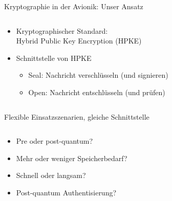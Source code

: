 \begin{frame}[c]{Kryptographie in der Avionik: Unser Ansatz}
  \begin{columns}[fullwidth,c]
    \begin{column}{.65\linewidth}
      \begin{itemize}
        \item Kryptographischer Standard:\\
        Hybrid Public Key Encryption (HPKE)
        \item Schnittstelle von HPKE
        \begin{itemize}
          \item Seal: Nachricht verschlüsseln (und signieren)
          \item Open: Nachricht entschlüsseln (und prüfen)
        \end{itemize}
      \end{itemize}
    \end{column}%
    \hfill
  \end{columns}
\end{frame}


\begin{frame}[c]{Flexible Einsatzszenarien, gleiche Schnittstelle}
  \begin{columns}[fullwidth,c]
  \hfill
    \begin{column}{.65\linewidth}
      \begin{itemize}
        \item Pre oder post-quantum?
        \item Mehr oder weniger Speicherbedarf?
        \item Schnell oder langsam?
        \item Post-quantum Authentisierung? 
      \end{itemize}
    \end{column}%
  \end{columns}
\end{frame}


